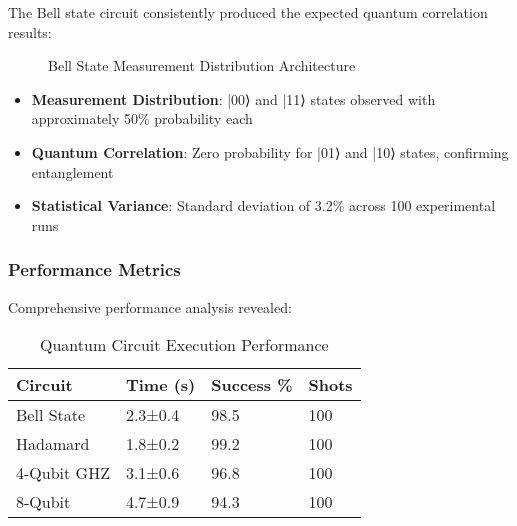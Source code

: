 \documentclass[conference]{IEEEtran}
\begin{document}
The Bell state circuit consistently produced the expected quantum correlation results:

\begin{figure}[h]
\centering
{}
\caption{Bell State Measurement Distribution Architecture}
\label{fig:bell_results}
\end{figure}

\begin{itemize}
    \item \textbf{Measurement Distribution}: |00⟩ and |11⟩ states observed with approximately 50\% probability each
    \item \textbf{Quantum Correlation}: Zero probability for |01⟩ and |10⟩ states, confirming entanglement
    \item \textbf{Statistical Variance}: Standard deviation of 3.2\% across 100 experimental runs
\end{itemize}

\subsubsection{Performance Metrics}

Comprehensive performance analysis revealed:

\begin{table}[h]
\centering
\caption{Quantum Circuit Execution Performance}
\footnotesize
\begin{tabular}{|p{1.8cm}|p{1.5cm}|p{1.5cm}|p{1cm}|}
\hline
\textbf{Circuit} & \textbf{Time (s)} & \textbf{Success \%} & \textbf{Shots} \\
\hline
Bell State & 2.3±0.4 & 98.5 & 100 \\
Hadamard & 1.8±0.2 & 99.2 & 100 \\
4-Qubit GHZ & 3.1±0.6 & 96.8 & 100 \\
8-Qubit & 4.7±0.9 & 94.3 & 100 \\
\hline
\end{tabular}
\end{table}
\end{document}
